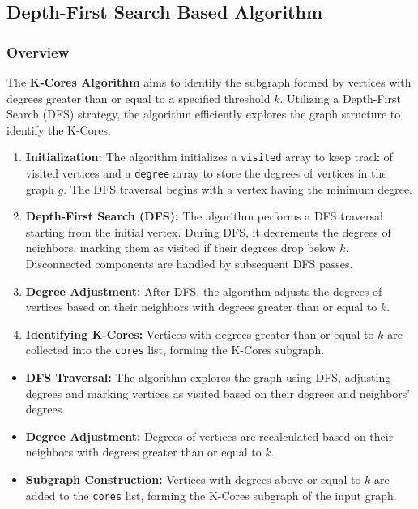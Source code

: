 \subsection{Depth-First Search Based Algorithm}

\subsubsection{Overview}

The \textbf{K-Cores Algorithm} aims to identify the subgraph formed by vertices with degrees greater than or equal to a specified threshold \(k\). Utilizing a Depth-First Search (DFS) strategy, the algorithm efficiently explores the graph structure to identify the K-Cores.

\begin{enumerate}
    \item \textbf{Initialization:} The algorithm initializes a \texttt{visited} array to keep track of visited vertices and a \texttt{degree} array to store the degrees of vertices in the graph \(g\). The DFS traversal begins with a vertex having the minimum degree.
    
    \item \textbf{Depth-First Search (DFS):} The algorithm performs a DFS traversal starting from the initial vertex. During DFS, it decrements the degrees of neighbors, marking them as visited if their degrees drop below \(k\). Disconnected components are handled by subsequent DFS passes.
    
    \item \textbf{Degree Adjustment:} After DFS, the algorithm adjusts the degrees of vertices based on their neighbors with degrees greater than or equal to \(k\).
    
    \item \textbf{Identifying K-Cores:} Vertices with degrees greater than or equal to \(k\) are collected into the \texttt{cores} list, forming the K-Cores subgraph.
\end{enumerate}

\begin{itemize}
    \item \textbf{DFS Traversal:} The algorithm explores the graph using DFS, adjusting degrees and marking vertices as visited based on their degrees and neighbors' degrees.
    
    \item \textbf{Degree Adjustment:} Degrees of vertices are recalculated based on their neighbors with degrees greater than or equal to \(k\).
    
    \item \textbf{Subgraph Construction:} Vertices with degrees above or equal to \(k\) are added to the \texttt{cores} list, forming the K-Cores subgraph of the input graph.
\end{itemize}

